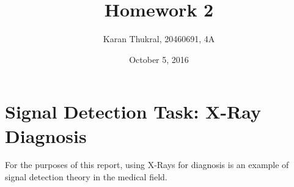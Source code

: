 \documentclass[12pt]{article}
\title{Homework 2}
\author{Karan Thukral, 20460691, 4A}
\date{October 5, 2016}
\begin{document}
	\makereporttitle


	\startarabicpagenumbers
	\section{Signal Detection Task: X-Ray Diagnosis}
	For the purposes of this report, using X-Rays for diagnosis is an example of signal detection theory in the medical field.
	
\end{document}
